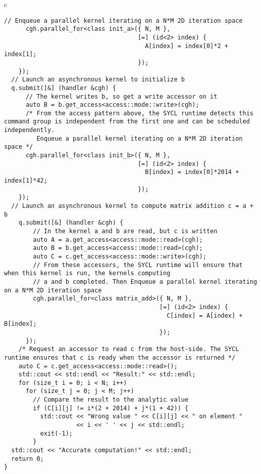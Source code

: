 \documentclass[sigplan, review, authordraft]{acmart}
\begin{document}
\begin{figure*}
\begin{tabular}{c}
\begin{lstlisting}[basicstyle=\scriptsize,name=example]
      // Enqueue a parallel kernel iterating on a N*M 2D iteration space
      cgh.parallel_for<class init_a>({ N, M },
                                     [=] (id<2> index) {
                                       A[index] = index[0]*2 + index[1];
                                     });
    });
  // Launch an asynchronous kernel to initialize b
  q.submit([&] (handler &cgh) {
      // The kernel writes b, so get a write accessor on it
      auto B = b.get_access<access::mode::write>(cgh);
      /* From the access pattern above, the SYCL runtime detects this command group is independent from the first one and can be scheduled independently.
         Enqueue a parallel kernel iterating on a N*M 2D iteration space */
      cgh.parallel_for<class init_b>({ N, M },
                                     [=] (id<2> index) {
                                       B[index] = index[0]*2014 + index[1]*42;
                                     });
    });
  // Launch an asynchronous kernel to compute matrix addition c = a + b
    q.submit([&] (handler &cgh) {
        // In the kernel a and b are read, but c is written
        auto A = a.get_access<access::mode::read>(cgh);
        auto B = b.get_access<access::mode::read>(cgh);
        auto C = c.get_access<access::mode::write>(cgh);
        // From these accessors, the SYCL runtime will ensure that when this kernel is run, the kernels computing
        // a and b completed. Then Enqueue a parallel kernel iterating on a N*M 2D iteration space
        cgh.parallel_for<class matrix_add>({ N, M },
                                           [=] (id<2> index) {
                                             C[index] = A[index] + B[index];
                                           });
      });
    /* Request an accessor to read c from the host-side. The SYCL runtime ensures that c is ready when the accessor is returned */
    auto C = c.get_access<access::mode::read>();
    std::cout << std::endl << "Result:" << std::endl;
    for (size_t i = 0; i < N; i++)
      for (size_t j = 0; j < M; j++)
        // Compare the result to the analytic value
        if (C[i][j] != i*(2 + 2014) + j*(1 + 42)) {
          std::cout << "Wrong value " << C[i][j] << " on element "
                    << i << ' ' << j << std::endl;
          exit(-1);
        }
  std::cout << "Accurate computation!" << std::endl;
  return 0;
}
    \end{lstlisting}
  \end{tabular}
  \caption{Example of a SYCL C++ program producing and adding 2
    matrices, coming from from
    \url{https://github.com/triSYCL/triSYCL/blob/master/tests/examples/demo_parallel_matrix_add.cpp}.\label{fig:SYCL-example}}
\end{figure*}
\end{document}

